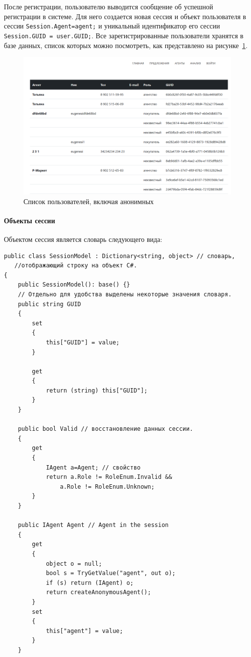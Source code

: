 \documentclass[a4paper,14pt,openany,final]{extreport} %
\begin{document}
{После регистрации, пользователю выводится сообщение об успешной регистрации в системе. Для него создается новая сессия и  объект пользователя в сессии \verb|Session.Agent=agent;| и уникальный идентификатор его сессии \verb|Session.GUID = user.GUID;|. Все зарегистрированные пользователи хранятся в базе данных, список которых можно посмотреть, как представлено на рисунке~\ref{fig:userlist}.
\begin{figure}[htbp]
  \centering
  \includegraphics[width=0.8\linewidth]{screen-user-list.png}
  \caption{Список пользователей, включая анонимных}
  \label{fig:userlist}
\end{figure}

\paragraph{Объекты сессии}
Объектом сессия является словарь следующего вида:
\begin{verbatim}
public class SessionModel : Dictionary<string, object> // словарь,
   //отображающий строку на объект C#.
{
    public SessionModel(): base() {}
    // Отдельно для удобства выделены некоторые значения словаря.
    public string GUID
    {
        set
        {
            this["GUID"] = value;
        }

        get
        {
            return (string) this["GUID"];
        }
    }

    public bool Valid // восстановление данных сессии.
    {
        get
        {
            IAgent a=Agent; // свойство
            return a.Role != RoleEnum.Invalid &&
                a.Role != RoleEnum.Unknown;
        }
    }

    public IAgent Agent // Agent in the session
    {
        get
        {
            object o = null;
            bool s = TryGetValue("agent", out o);
            if (s) return (IAgent) o;
            return createAnonymousAgent();
        }
        set
        {
            this["agent"] = value;
        }
    }


\end{verbatim}}
\end{document}
